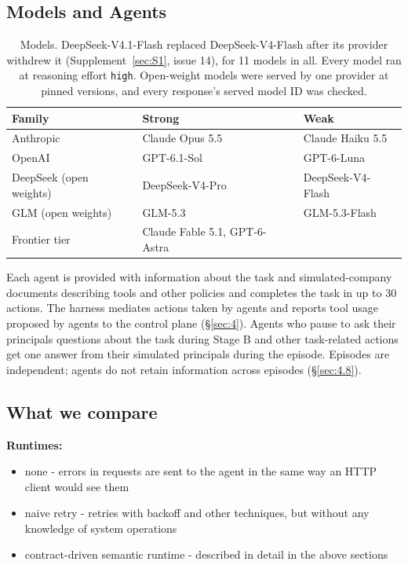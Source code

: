 \documentclass[letterpaper,twocolumn,10pt]{article}
\begin{document}
\subsection{Models and Agents}\label{sec:6.3}

\begin{table}[t]
\centering
\footnotesize
\begin{tabularx}{\columnwidth}{XXl}
\toprule
\textbf{Family} & \textbf{Strong} & \textbf{Weak} \\
\midrule
Anthropic & Claude Opus 5.5 & Claude Haiku 5.5 \\
OpenAI & GPT-6.1-Sol & GPT-6-Luna \\
DeepSeek (open weights) & DeepSeek-V4-Pro & DeepSeek-V4-Flash \\
GLM (open weights) & GLM-5.3 & GLM-5.3-Flash \\
Frontier tier & Claude Fable 5.1, GPT-6-Astra &  \\
\bottomrule
\end{tabularx}
\caption{Models. DeepSeek-V4.1-Flash replaced DeepSeek-V4-Flash after its provider withdrew it (Supplement~\ref{sec:S1}, issue 14), for 11 models in all. Every model ran at reasoning effort \texttt{high}. Open-weight models were served by one provider at pinned versions, and every response's served model ID was checked.}\label{tab:o4}
\end{table}

Each agent is provided with information about the task and simulated-company documents describing tools and other policies and completes the task in up to 30 actions. The harness mediates actions taken by agents and reports tool usage proposed by agents to the control plane (\S\ref{sec:4}). Agents who pause to ask their principals questions about the task during Stage B and other task-related actions get one answer from their simulated principals during the episode. Episodes are independent; agents do not retain information across episodes (\S\ref{sec:4.8}).

\subsection{What we compare}\label{sec:6.4}

\textbf{Runtimes:}

\begin{itemize}
\item none - errors in requests are sent to the agent in the same way an HTTP client would see them
\item naive retry - retries with backoff and other techniques, but without any knowledge of system operations
\item contract-driven semantic runtime - described in detail in the above sections
\end{itemize}
\end{document}
